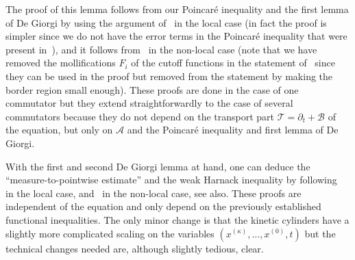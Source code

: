 \documentclass[10pt]{amsart}
\theoremstyle{definition}
\newcommand{\cA}{{\mathcal A}}
\newcommand{\cB}{{\mathcal B}}
\newcommand{\cT}{{\mathcal T}}
\begin{document}
The proof of this lemma follows from our Poincaré inequality
and the first lemma of De Giorgi by using the argument
of~\cite[\S 3.2]{guerand-mouhot} in the local case (in
fact the proof is simpler since we do not have the error terms in
the Poincaré inequality that were present
in~\cite{guerand-mouhot}), and it follows
from~\cite[\S 5.2]{loher-2022-preprint-quantitative-de-giorgi}
in the non-local case (note that we have removed the
mollifications $F_i$ of the cutoff functions in the statement
of~\cite{loher-2022-preprint-quantitative-de-giorgi} since they
can be used in the proof but removed from the statement by making the border region small
enough). These proofs are done in the case of one commutator but
they extend straightforwardly to the case of several commutators
because they do not depend on the transport part
$\cT = \partial_t + \cB$ of the equation, but only on $\cA$ and
the Poincaré inequality and first lemma of De Giorgi.

With the first and second De Giorgi lemma at hand, one can deduce
the ``measure-to-pointwise estimate'' and the weak Harnack
inequality by following~\cite{guerand-mouhot} in the local case,
and~\cite{loher-2022-preprint-quantitative-de-giorgi} in the
non-local case, see \cite{APP} also. These proofs are independent of the equation and
only depend on the previously established functional
inequalities. The only minor change is that the kinetic cylinders
have a slightly more complicated scaling on the variables
$(x^{(\kappa)},\dots,x^{(0)},t)$ but the technical changes needed
are, although slightly tedious, clear.
\end{document}
